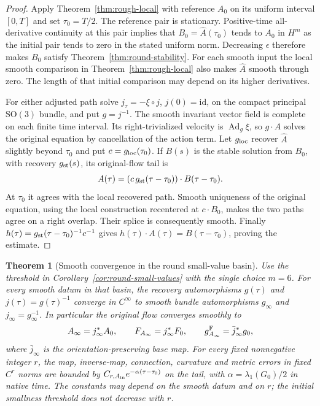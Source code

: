 \documentclass[11pt]{article}
\numberwithin{equation}{section}
\newtheorem{theorem}{Theorem}[section]
\theoremstyle{definition}
\theoremstyle{remark}
\begin{document}
\begin{proof}
Apply Theorem~\ref{thm:rough-local} with reference $A_0$
on its uniform interval $[0,T]$ and set $\tau_0=T/2$.
The reference pair is stationary. Positive-time
all-derivative continuity at this pair implies that
$B_0=\widehat A(\tau_0)$ tends to $A_0$ in $H^m$
as the initial pair tends to zero in the stated
uniform norm. Decreasing $\epsilon$ therefore makes
$B_0$ satisfy Theorem~\ref{thm:round-stability}.
For each smooth input the local smooth comparison in
Theorem~\ref{thm:rough-local} also makes $\widehat A$
smooth through zero. The length of that initial
comparison may depend on its higher derivatives.

For either adjusted path solve
$j_\tau=-\xi\circ j$, $j(0)=\mathrm{id}$, on the
compact principal $\mathrm{SO}(3)$ bundle, and put
$g=j^{-1}$. The smooth invariant vector field is
complete on each finite time interval. Its right-trivialized
velocity is $\operatorname{Ad}_g\xi$, so $g\cdot A$
solves the original equation by cancellation of
the action term. Let $g_{\rm loc}$ recover
$\widehat A$ slightly beyond $\tau_0$ and put
$c=g_{\rm loc}(\tau_0)$.
If $B(s)$ is the stable solution from $B_0$, with
recovery $g_{\rm st}(s)$, its original-flow tail is
\[
 A(\tau)=(c\,g_{\rm st}(\tau-\tau_0))
                  \cdot B(\tau-\tau_0).
\]
At $\tau_0$ it agrees with the local recovered path.
Smooth uniqueness of the original equation, using the
local construction recentered at $c\cdot B_0$, makes
the two paths agree on a right overlap. Their splice
is consequently smooth. Finally
$h(\tau)=g_{\rm st}(\tau-\tau_0)^{-1}c^{-1}$
gives $h(\tau)\cdot A(\tau)=B(\tau-\tau_0)$, proving
the estimate.
\end{proof}

\begin{theorem}[Smooth convergence in the round small-value basin]
\label{thm:round-smooth-limit}
Use the threshold in Corollary~\ref{cor:round-small-values}
with the single choice $m=6$. For every smooth datum in
that basin, the recovery automorphisms $g(\tau)$ and
$j(\tau)=g(\tau)^{-1}$ converge in $C^\infty$ to smooth
bundle automorphisms $g_\infty$ and $j_\infty=g_\infty^{-1}$.
In particular the original flow converges smoothly to
\[
 A_\infty=j_\infty^*A_0,\qquad
 F_{A_\infty}=j_\infty^*F_0,\qquad
 g^{\rm F}_{A_\infty}=\bar j_\infty^*g_0,
\]
where $\bar j_\infty$ is the orientation-preserving base map.
For every fixed nonnegative integer $r$, the map, inverse-map,
connection, curvature and metric errors in fixed $C^r$ norms
are bounded by $C_{r,A_{\rm in}}e^{-\alpha(\tau-\tau_0)}$
on the tail, with $\alpha=\lambda_1(G_0)/2$ in native time.
The constants may depend on the smooth datum and on $r$;
the initial smallness threshold does not decrease with $r$.
\end{theorem}
\end{document}
